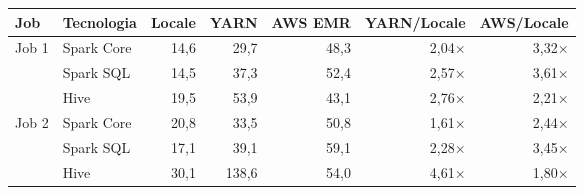 \begin{tabular}{@{}l l r r r r r@{}}
\toprule
Job & Tecnologia & Locale & YARN & AWS EMR & YARN/Locale & AWS/Locale \\
\midrule
\multirow{3}{*}{Job 1} & Spark Core & 14,6 & 29,7 & 48,3 & 2,04$\times$ & 3,32$\times$ \\
 & Spark SQL & 14,5 & 37,3 & 52,4 & 2,57$\times$ & 3,61$\times$ \\
 & Hive & 19,5 & 53,9 & 43,1 & 2,76$\times$ & 2,21$\times$ \\
\midrule
\multirow{3}{*}{Job 2} & Spark Core & 20,8 & 33,5 & 50,8 & 1,61$\times$ & 2,44$\times$ \\
 & Spark SQL & 17,1 & 39,1 & 59,1 & 2,28$\times$ & 3,45$\times$ \\
 & Hive & 30,1 & 138,6 & 54,0 & 4,61$\times$ & 1,80$\times$ \\
\bottomrule
\end{tabular}